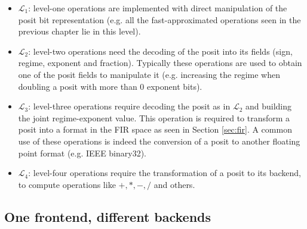 \begin{itemize}
    \item $\mathcal{L}_1$: level-one operations are implemented with direct manipulation of the posit bit representation (e.g. all the fast-approximated operations seen in the previous chapter lie in this level).
    \item $\mathcal{L}_2$: level-two operations need the decoding of the posit into its fields (sign, regime, exponent and fraction). Typically these operations are used to obtain one of the posit fields to manipulate it (e.g. increasing the regime when doubling a posit with more than 0 exponent bits).
    \item $\mathcal{L}_3$: level-three operations require decoding the posit as in $\mathcal{L}_2$ and building the joint regime-exponent value. This operation is required to transform a posit into a format in the FIR space as seen in Section \ref{sec:fir}. A common use of these operations is indeed the conversion of a posit to another floating point format (e.g. IEEE binary32).
    \item $\mathcal{L}_4$: level-four operations require the transformation of a posit to its backend, to compute operations like $+,*,-,/$ and others.
\end{itemize}

\subsection{One frontend, different backends}

